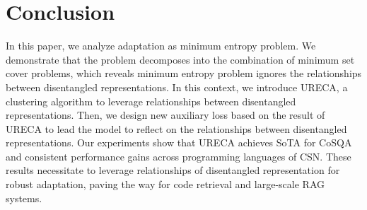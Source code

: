 \section{Conclusion}


In this paper, we analyze adaptation as minimum entropy problem. 
We demonstrate that the problem decomposes into the combination of minimum set cover problems, 
which reveals minimum entropy problem ignores the relationships between disentangled representations. 
In this context, we introduce URECA, a clustering algorithm to leverage relationships between disentangled representations. 
Then, we design new auxiliary loss based on the result of URECA to lead the model to reflect on the relationships 
between disentangled representations. 
Our experiments show that URECA achieves SoTA for CoSQA and consistent performance gains across programming languages of CSN. 
These results necessitate to leverage relationships of disentangled representation for robust adaptation, 
paving the way for code retrieval and large-scale RAG systems.
